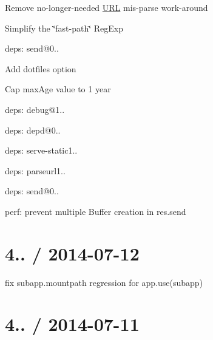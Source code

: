 \begin{DoxyItemize}
\begin{DoxyItemize}
\item Remove no-\/longer-\/needed \hyperlink{struct_u_r_l}{U\+R\+L} mis-\/parse work-\/around
\item Simplify the \char`\"{}fast-\/path\char`\"{} {\ttfamily Reg\+Exp}
\end{DoxyItemize}
\item deps\+: send@0..
\begin{DoxyItemize}
\item Add {\ttfamily dotfiles} option
\item Cap {\ttfamily max\+Age} value to 1 year
\item deps\+: debug@1..
\item deps\+: depd@0..
\end{DoxyItemize}
\item deps\+: serve-\/static1..
\begin{DoxyItemize}
\item deps\+: parseurl1..
\item deps\+: send@0..
\end{DoxyItemize}
\item perf\+: prevent multiple {\ttfamily Buffer} creation in {\ttfamily res.\+send}
\end{DoxyItemize}

\section*{4.. / 2014-\/07-\/12 }


\begin{DoxyItemize}
\item fix {\ttfamily subapp.\+mountpath} regression for {\ttfamily app.\+use(subapp)}
\end{DoxyItemize}

\section*{4.. / 2014-\/07-\/11 }


